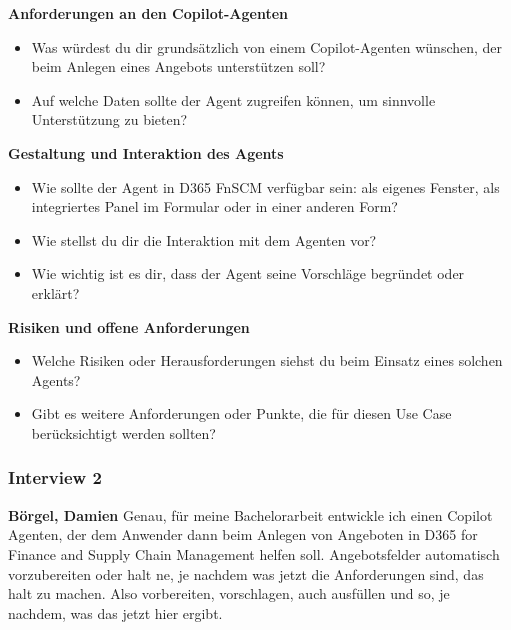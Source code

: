 \vspace{0.5em}

\textbf{Anforderungen an den Copilot-Agenten}

\begin{itemize}
    \item Was würdest du dir grundsätzlich von einem Copilot-Agenten wünschen, der beim Anlegen eines Angebots unterstützen soll?
    \item Auf welche Daten sollte der Agent zugreifen können, um sinnvolle Unterstützung zu bieten?
\end{itemize}

\vspace{0.5em}

\textbf{Gestaltung und Interaktion des Agents}

\begin{itemize}
    \item Wie sollte der Agent in D365 FnSCM verfügbar sein: als eigenes Fenster, als integriertes Panel im Formular oder in einer anderen Form?
    \item Wie stellst du dir die Interaktion mit dem Agenten vor?
    \item Wie wichtig ist es dir, dass der Agent seine Vorschläge begründet oder erklärt?
\end{itemize}

\vspace{0.5em}

\textbf{Risiken und offene Anforderungen}

\begin{itemize}
    \item Welche Risiken oder Herausforderungen siehst du beim Einsatz eines solchen Agents?
    \item Gibt es weitere Anforderungen oder Punkte, die für diesen Use Case berücksichtigt werden sollten?
\end{itemize}

\subsubsection{Interview 2}
\label{anhang:i2}
\textbf{Börgel, Damien}\newline
Genau, für meine Bachelorarbeit entwickle ich einen Copilot Agenten, der dem Anwender dann beim Anlegen von Angeboten in D365 for Finance and Supply Chain Management helfen soll.
Angebotsfelder automatisch vorzubereiten oder halt ne, je nachdem was jetzt die Anforderungen sind, das halt zu machen. Also vorbereiten, vorschlagen, auch ausfüllen und so, je nachdem, was das jetzt hier ergibt.

